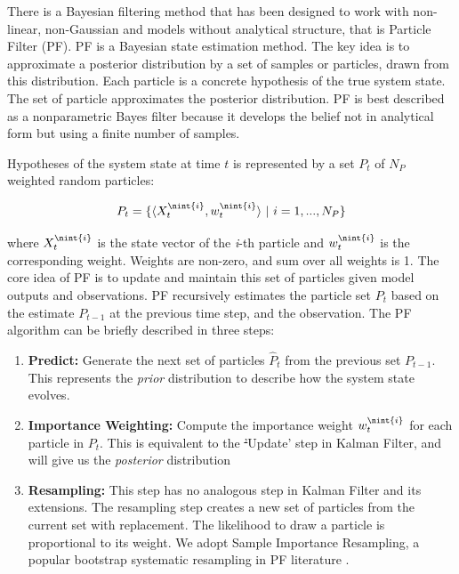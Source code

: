 \documentclass[11pt]{article}
\DeclarePairedDelimiter{\nint}\lfloor\rceil
\providecommand{\DIFaddtex}[1]{{\protect\color{blue}\uwave{#1}}} %
\providecommand{\DIFdeltex}[1]{{\protect\color{red}\sout{#1}}}                      %
\providecommand{\DIFaddbegin}{} %
\providecommand{\DIFaddend}{} %
\providecommand{\DIFdelbegin}{} %
\providecommand{\DIFdelend}{} %
\providecommand{\DIFadd}[1]{\texorpdfstring{\DIFaddtex{#1}}{#1}} %
\providecommand{\DIFdel}[1]{\texorpdfstring{\DIFdeltex{#1}}{}} %
\newcommand{\DIFscaledelfig}{0.5}
\newlength{\DIFdelgraphicswidth} %
\newlength{\DIFdelgraphicsheight} %
\newcommand{\DIFaddincludegraphics}[2][]{{\color{blue}\fbox{\DIFOincludegraphics[#1]{#2}}}} %
\newcommand{\DIFdelincludegraphics}[2][]{%
\sbox{\DIFdelgraphicsbox}{\DIFOincludegraphics[#1]{#2}}%
\settoboxwidth{\DIFdelgraphicswidth}{\DIFdelgraphicsbox} %
\settoboxtotalheight{\DIFdelgraphicsheight}{\DIFdelgraphicsbox} %
\scalebox{\DIFscaledelfig}{%
\parbox[b]{\DIFdelgraphicswidth}{\usebox{\DIFdelgraphicsbox}\\[-\baselineskip] \rule{\DIFdelgraphicswidth}{0em}}\llap{\resizebox{\DIFdelgraphicswidth}{\DIFdelgraphicsheight}{%
\setlength{\unitlength}{\DIFdelgraphicswidth}%
\begin{picture}(1,1)%
\thicklines\linethickness{2pt} %
{\color[rgb]{1,0,0}\put(0,0){\framebox(1,1){}}}%
{\color[rgb]{1,0,0}\put(0,0){\line( 1,1){1}}}%
{\color[rgb]{1,0,0}\put(0,1){\line(1,-1){1}}}%
\end{picture}%
}\hspace*{3pt}}} %
} %
\DeclareRobustCommand{\DIFaddbegin}{\DIFOaddbegin \let\includegraphics\DIFaddincludegraphics} %
\DeclareRobustCommand{\DIFaddend}{\DIFOaddend \let\includegraphics\DIFOincludegraphics} %
\DeclareRobustCommand{\DIFdelbegin}{\DIFOdelbegin \let\includegraphics\DIFdelincludegraphics} %
\DeclareRobustCommand{\DIFdelend}{\DIFOaddend \let\includegraphics\DIFOincludegraphics} %
\begin{document}
There is a Bayesian filtering method that has been designed to work with non-linear, non-Gaussian and models without analytical structure, that is Particle Filter (PF). \DIFaddbegin \DIFadd{A }\DIFaddend PF is a Bayesian state estimation method. The key idea is to approximate a posterior distribution by a set of samples or particles, drawn from this distribution. Each particle is a concrete hypothesis of the true system state. The set of particle approximates the posterior distribution. PF is best described as a nonparametric Bayes filter because it develops the belief not in analytical form but using a finite number of samples. 

Hypotheses of the system state at time $t$ is represented by a set $P_t$ of $N_P$ weighted random particles: 
\DIFdelbegin %

\DIFdelend \begin{equation}
    P_t =  \{  \langle X_t^{\nint{i}}, w_t^{\nint{i}} \rangle \ | \ i=1,...,N_P \}
\end{equation}
\DIFdelbegin %

\DIFdelend where $X_t^{\nint{i}}$ is the state vector of the \textit{i}-th particle and $w_t^{\nint{i}}$ is the corresponding weight. Weights are non-zero, and sum over all weights is 1. The core idea of \DIFaddbegin \DIFadd{the }\DIFaddend PF is to update and maintain this set of particles given model outputs and observations. \DIFaddbegin \DIFadd{A }\DIFaddend PF recursively estimates the particle set $P_t$ based on the estimate $P_{t-1}$ at the previous time step, and the observation. The PF algorithm can be briefly described in three steps: 

\begin{enumerate}
    \item \textbf{Predict:} Generate the next set of particles $\hat{P}_t$ from the previous set $P_{t-1}$. This represents the \textit{prior} distribution to describe how the system state evolves. 
    \item \textbf{Importance Weighting:} Compute the importance weight $w_t^{\nint{i}}$ for each particle in $P_t$. This is equivalent to the \DIFdelbegin \DIFdel{'}\DIFdelend \DIFaddbegin \DIFadd{`}\DIFaddend Update' step in Kalman Filter, and will give us the \textit{posterior} distribution 
    \item \textbf{Resampling:} This step has no analogous step in Kalman Filter and its extensions. The resampling step creates a new set of particles from the current set with replacement. The likelihood to draw a particle is proportional to its weight. We adopt Sample Importance Resampling, a popular bootstrap systematic resampling in PF literature \citep{wang_data_2015, carrassi_data_2018}.
\end{enumerate}
\end{document}
